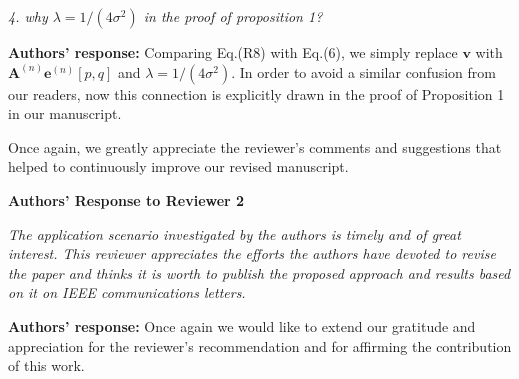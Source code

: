 \documentclass[onecolumn, 11pt, draftclsnofoot]{IEEEtran}
\begin{document}
\vspace{0.5cm}

\noindent
\emph{4. why $\lambda = 1/(4\sigma^2)$ in the proof of proposition 1?}

\noindent \textbf{Authors' response:}
Comparing Eq.(R8) with Eq.(6), we simply replace $\mathbf{v}$ with
$\mathbf{A}^{(n)}\mathbf{e}^{(n)}[p,q]$ and $\lambda = 1/(4\sigma^2)$. In order
to avoid a similar confusion from our readers, now this connection is explicitly
drawn in the proof of Proposition 1 in our manuscript.
 
\vspace{0.5cm}


Once again, we greatly appreciate the reviewer's comments and suggestions
that helped to continuously improve our revised manuscript. 

\newpage
\begin{center}
{\LARGE \textbf{Authors' Response to Reviewer 2}}
\end{center}

\noindent
\emph{The application scenario investigated by the authors is timely and of
great interest. This reviewer appreciates the efforts the authors have devoted
to revise the paper and thinks it is worth to publish the proposed approach and
results based on it on IEEE communications letters.}

\noindent \textbf{Authors' response:}
Once again we would like to extend our gratitude and appreciation for the
reviewer's recommendation and for affirming the contribution of this work.

\vspace{0.5cm}



\end{document}
